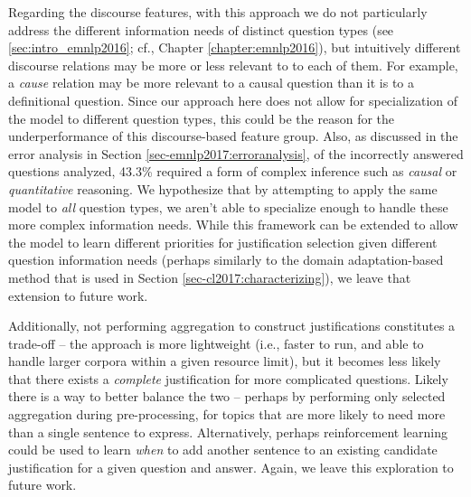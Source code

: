 Regarding the discourse features, with this approach we do not particularly address the different information needs of distinct question types (see \ref{sec:intro_emnlp2016}; cf., Chapter \ref{chapter:emnlp2016}), but intuitively different discourse relations may be more or less relevant to to each of them.  For example, a \textit{cause} relation may be more relevant to a causal question than it is to a definitional question.  Since our approach here does not allow for specialization of the model to different question types, this could be the reason for the underperformance of this discourse-based feature group.
Also, as discussed in the error analysis in Section \ref{sec-emnlp2017:erroranalysis}, of the incorrectly answered questions analyzed, 43.3\% required a form of complex inference such as \textit{causal} or \textit{quantitative} reasoning.  We hypothesize that by attempting to apply the same model to \textit{all} question types, we aren't able to specialize enough to handle these more complex information needs.   
While this framework can be extended to allow the model to learn different priorities for justification selection given different question information needs (perhaps similarly to the domain adaptation-based method that is used in Section \ref{sec-cl2017:characterizing}), we leave that extension to future work.  

Additionally, not performing aggregation to construct justifications constitutes a trade-off -- the approach is more lightweight (i.e., faster to run, and able to handle larger corpora within a given resource limit), but it becomes less likely that there exists a \textit{complete} justification for more complicated questions.  Likely there is a way to better balance the two -- perhaps by performing only selected aggregation during pre-processing, for topics that are more likely to need more than a single sentence to express.  Alternatively, perhaps reinforcement learning could be used to learn \textit{when} to add another sentence to an existing candidate justification for a given question and answer.  Again, we leave this exploration to future work.